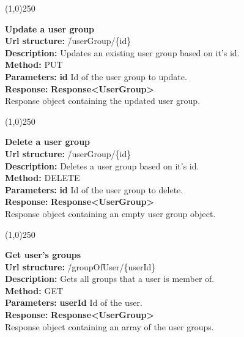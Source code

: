 \documentclass[11pt]{article}
\begin{document}
\begin{center}\line(1,0){250}\end{center}

\begin{tabbing}
\textbf{Update a user group} \\
\textcolor{black!60}{\textbf{Url structure:}} \hspace{0.2in} \= /userGroup/\{id\} \\
\textcolor{black!60}{\textbf{Description:}}  \> Updates an existing user group based on it's id. \\
\textcolor{black!60}{\textbf{Method:}} \> PUT \\
\textcolor{black!60}{\textbf{Parameters:}} \> \textbf{id} Id of the user group to update. \\
\textcolor{black!60}{\textbf{Response:}} \> \textbf{Response<UserGroup>} \\
\> Response object containing the updated user group.
\end{tabbing}

\begin{center}\line(1,0){250}\end{center}

\begin{tabbing}
\textbf{Delete a user group} \\
\textcolor{black!60}{\textbf{Url structure:}} \hspace{0.2in} \= /userGroup/\{id\} \\
\textcolor{black!60}{\textbf{Description:}}  \> Deletes a user group based on it's id. \\
\textcolor{black!60}{\textbf{Method:}} \> DELETE \\
\textcolor{black!60}{\textbf{Parameters:}} \> \textbf{id} Id of the user group to delete. \\
\textcolor{black!60}{\textbf{Response:}} \> \textbf{Response<UserGroup>} \\
\> Response object containing an empty user group object.
\end{tabbing}

\begin{center}\line(1,0){250}\end{center}

\begin{tabbing}
\textbf{Get user's groups} \\
\textcolor{black!60}{\textbf{Url structure:}} \hspace{0.2in} \= /groupOfUser/\{userId\} \\
\textcolor{black!60}{\textbf{Description:}}  \> Gets all groups that a user is member of. \\
\textcolor{black!60}{\textbf{Method:}} \> GET \\
\textcolor{black!60}{\textbf{Parameters:}} \> \textbf{userId} Id of the user. \\
\textcolor{black!60}{\textbf{Response:}} \> \textbf{Response<UserGroup>} \\
\> Response object containing an array of the user groups.
\end{tabbing}
\end{document}

